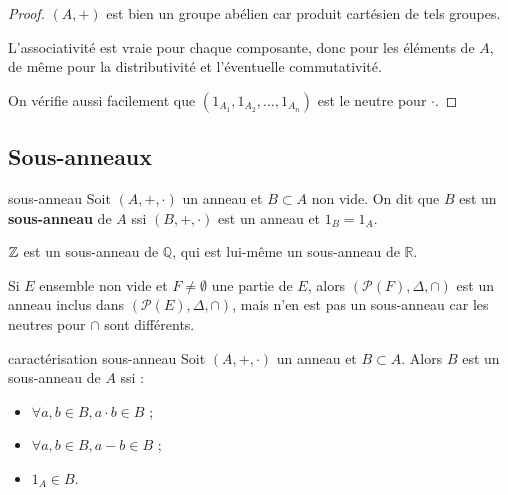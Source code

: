 \begin{proof}
    $(A, +)$ est bien un groupe abélien car produit cartésien de tels groupes.

    \svspace L'associativité est vraie pour chaque composante, donc pour les éléments de $A$, 
    de même pour la distributivité et l'éventuelle commutativité.

    \svspace On vérifie aussi facilement que 
    $(1_{A_1}, 1_{A_2}, \ldots, 1_{A_n})$ est le neutre pour $\cdot$.
\end{proof}


\subsection{Sous-anneaux}

\begin{definition}{sous-anneau}{}
    Soit $(A, +, \cdot)$ un anneau et $B \subset A$ non vide. On dit que $B$ est un 
    \textbf{sous-anneau} de $A$ ssi $(B, +, \cdot)$ est un anneau et $1_B = 1_A$.
\end{definition}

\begin{exemple}
    $\mathbb{Z}$ est un sous-anneau de $\mathbb{Q}$, qui est lui-même un sous-anneau de $\mathbb{R}$.

    Si $E$ ensemble non vide et $F \neq \emptyset$ une partie de $E$, alors
    $(\mathscr{P}(F), \Delta, \cap)$ est un anneau inclus dans $(\mathscr{P}(E), \Delta, \cap)$,
    mais n'en est pas un sous-anneau car les neutres pour $\cap$ sont différents.  
\end{exemple}

\begin{proposition}{caractérisation sous-anneau}{}
    Soit $(A, +, \cdot)$ un anneau et $B \subset A$. Alors 
    $B$ est un sous-anneau de $A$ ssi : 
    \begin{itemize}
        \item $\forall a, b \in B, a \cdot b \in B$ ;
        \item $\forall a, b \in B, a - b \in B$ ;
        \item $1_A \in B$.
    \end{itemize}
    
\end{proposition}


